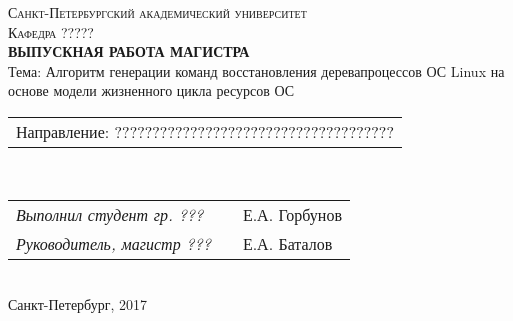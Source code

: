 \begin{titlepage}

\newcommand{\HRule}{\rule{\linewidth}{0.5mm}} %

\begin{center}
 

\textsc{Санкт-Петербургский академический университет \\ Кафедра ?????}\\[8cm]

{ \Large \bfseries ВЫПУСКНАЯ РАБОТА МАГИСТРА }\\
{ \large  Тема: Алгоритм генерации команд восстановления деревапроцессов ОС Linux на основе модели жизненного цикла ресурсов ОС}\\[1.9cm]
 

\begin{minipage}{1\textwidth}
\begin{flushleft} \large

\begin{tabular}{l}
Направление: ?????????????????????????????????????
\end{tabular}
\\[0.5cm]
\begin{tabular}{lcl}
\emph{Выполнил студент гр. ???} & \underline{\hspace{3cm}} & Е.А. Горбунов\\
\emph{Руководитель, магистр ???} &  \underline{\hspace{3cm}} & Е.А. Баталов \\ %
\end{tabular}
\end{flushleft}
\end{minipage}\\[7.5cm]



{\large Санкт-Петербург, 2017}
\end{center} 

\end{titlepage}